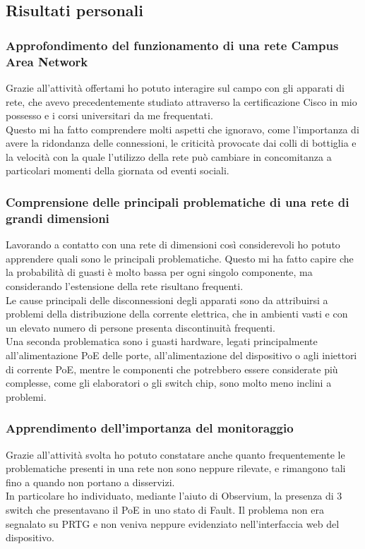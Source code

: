 \documentclass[Tesi.tex]{subfiles}
\begin{document}
\subsection{Risultati personali}
\subsubsection{Approfondimento del funzionamento di una rete Campus Area Network}
Grazie all'attività offertami ho potuto interagire sul campo con gli apparati di rete, che avevo precedentemente studiato attraverso la certificazione Cisco in mio possesso e i corsi universitari da me frequentati. \\
Questo mi ha fatto comprendere molti aspetti che ignoravo, come l'importanza di avere la ridondanza delle connessioni, le criticità provocate dai colli di bottiglia e la velocità con la quale l'utilizzo della rete può cambiare in concomitanza a particolari momenti della giornata od eventi sociali.

\subsubsection{Comprensione delle principali problematiche di una rete di grandi dimensioni}
Lavorando a contatto con una rete di dimensioni così considerevoli ho potuto apprendere quali sono le principali problematiche. Questo mi ha fatto capire che la probabilità di guasti è molto bassa per ogni singolo componente, ma considerando l'estensione della rete risultano frequenti. \\
Le cause principali delle disconnessioni degli apparati sono da attribuirsi a problemi della distribuzione della corrente elettrica, che in ambienti vasti e con un elevato numero di persone presenta discontinuità frequenti. \\
Una seconda problematica sono i guasti hardware, legati principalmente all'alimentazione PoE delle porte, all'alimentazione del dispositivo o agli iniettori di corrente PoE, mentre le componenti che potrebbero essere considerate più complesse, come gli elaboratori o gli switch chip, sono molto meno inclini a problemi.

\newpage
\subsubsection{Apprendimento dell'importanza del monitoraggio}
Grazie all'attività svolta ho potuto constatare anche quanto frequentemente le problematiche presenti in una rete non sono neppure rilevate, e rimangono tali fino a quando non portano a disservizi. \\
In particolare ho individuato, mediante l'aiuto di Observium, la presenza di 3 switch che presentavano il PoE in uno stato di Fault. Il problema non era segnalato su PRTG e non veniva neppure evidenziato nell'interfaccia web del dispositivo.
\end{document}
